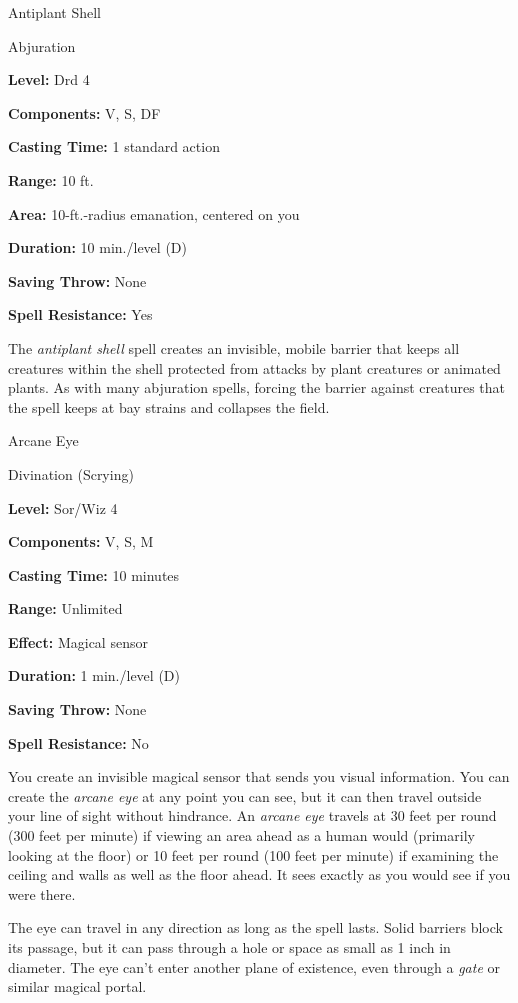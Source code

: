 \documentclass{article}
\begin{document}
\vspace{12pt}
Antiplant Shell

Abjuration

\textbf{Level:} Drd 4

\textbf{Components:} V, S, DF

\textbf{Casting Time:} 1 standard action

\textbf{Range:} 10 ft.

\textbf{Area:} 10-ft.-radius emanation, centered on you

\textbf{Duration:} 10 min./level (D)

\textbf{Saving Throw:} None

\textbf{Spell Resistance:} Yes

The \textit{antiplant shell }spell creates an invisible, mobile barrier that keeps 
all creatures within the shell protected from attacks by plant creatures or animated 
plants. As with many abjuration spells, forcing the barrier against creatures that 
the spell keeps at bay strains and collapses the field.

\vspace{12pt}
Arcane Eye

Divination (Scrying)

\textbf{Level:} Sor/Wiz 4

\textbf{Components:} V, S, M

\textbf{Casting Time:} 10 minutes

\textbf{Range:} Unlimited

\textbf{Effect: }Magical sensor

\textbf{Duration:} 1 min./level (D)

\textbf{Saving Throw:} None

\textbf{Spell Resistance:} No

You create an invisible magical sensor that sends you visual information. You can 
create the \textit{arcane eye }at any point you can see, but it can then travel 
outside your line of sight without hindrance. An \textit{arcane eye }travels at 
30 feet per round (300 feet per minute) if viewing an area ahead as a human would 
(primarily looking at the floor) or 10 feet per round (100 feet per minute) if 
examining the ceiling and walls as well as the floor ahead. It sees exactly as 
you would see if you were there.

The eye can travel in any direction as long as the spell lasts. Solid barriers 
block its passage, but it can pass through a hole or space as small as 1 inch in 
diameter. The eye can't enter another plane of existence, even through a \textit{gate 
}or similar magical portal.
\end{document}
